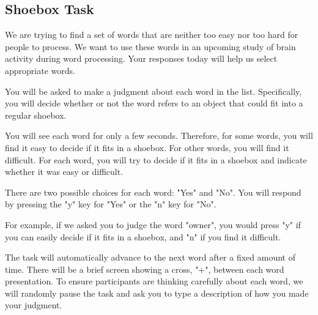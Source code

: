 \documentclass[man,natbib,floatsintext]{apa6} %
\begin{document}
\subsection{Shoebox Task}
\begin{displayquote}
We are trying to find a set of words that are neither too easy nor too hard for people to process. We want to use these words in an upcoming study of brain activity during word processing. Your responses today will help us select appropriate words.

You will be asked to make a judgment about each word in the list. Specifically, you will decide whether or not the word refers to an object that could fit into a regular shoebox.

You will see each word for only a few seconds. Therefore, for some words, you will find it easy to decide if it fits in a shoebox. For other words, you will find it difficult. For each word, you will try to decide if it fits in a shoebox and indicate whether it was easy or difficult.

There are two possible choices for each word: "Yes" and "No". You will respond by pressing the "y" key for "Yes" or the "n" key for "No".

For example, if we asked you to judge the word "owner", you would press "y" if you can easily decide if it fits in a shoebox, and "n" if you find it difficult.

The task will automatically advance to the next word after a fixed amount of time. There will be a brief screen showing a cross, "+", between each word presentation.
To ensure participants are thinking carefully about each word, we will randomly pause the task and ask you to type a description of how you made your judgment.
\end{displayquote}
\end{document}
